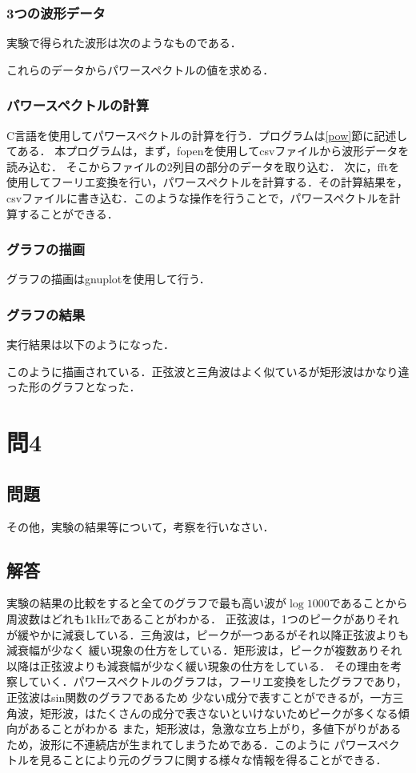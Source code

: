 \subsubsection{3つの波形データ}
実験で得られた波形は次のようなものである．

これらのデータからパワースペクトルの値を求める．
\subsubsection{パワースペクトルの計算}
C言語を使用してパワースペクトルの計算を行う．プログラムは\ref{pow}節に記述してある．
本プログラムは，まず，fopenを使用してcsvファイルから波形データを読み込む．
そこからファイルの2列目の部分のデータを取り込む．
次に，fftを使用してフーリエ変換を行い，パワースペクトルを計算する．その計算結果を，
csvファイルに書き込む．このような操作を行うことで，パワースペクトルを計算することができる．
\subsubsection{グラフの描画}
グラフの描画はgnuplotを使用して行う．
\subsubsection{グラフの結果}
実行結果は以下のようになった．

このように描画されている．正弦波と三角波はよく似ているが矩形波はかなり違った形のグラフとなった．
    \section{問4} \label{sec:absatract}
\subsection{問題}
その他，実験の結果等について，考察を行いなさい．
\subsection{解答}
実験の結果の比較をすると全てのグラフで最も高い波が$\log 1000$であることから周波数はどれも1kHzであることがわかる．
正弦波は，1つのピークがありそれが緩やかに減衰している．三角波は，ピークが一つあるがそれ以降正弦波よりも減衰幅が少なく
緩い現象の仕方をしている．矩形波は，ピークが複数ありそれ以降は正弦波よりも減衰幅が少なく緩い現象の仕方をしている．
その理由を考察していく．パワースペクトルのグラフは，フーリエ変換をしたグラフであり，正弦波はsin関数のグラフであるため
少ない成分で表すことができるが，一方三角波，矩形波，はたくさんの成分で表さないといけないためピークが多くなる傾向があることがわかる
また，矩形波は，急激な立ち上がり，多値下がりがあるため，波形に不連続店が生まれてしまうためである．このように
パワースペクトルを見ることにより元のグラフに関する様々な情報を得ることができる．
